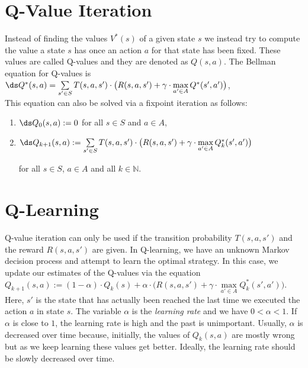 \section{Q-Value Iteration}
Instead of finding the values $V^*(s)$ of a given state $s$ we instead try to compute the value a state
$s$ has once an action $a$ for that state has been fixed.  These values are called Q-values and they
are denoted as $Q(s,a)$.  The Bellman equation for Q-values is
\\[0.2cm]
\hspace*{1.3cm}
$\ds Q^*(s,a) = \sum\limits_{s' \in S} T(s,a,s') \cdot \bigl(R(s,a,s') + \gamma \cdot \max\limits_{a' \in A} Q^*(s',a')\bigr)$,
\\[0.2cm]
This equation can also be solved via a fixpoint iteration as follows:
\begin{enumerate}
\item $\ds Q_0(s,a) := 0$ for all $s \in S$ and $a \in A$,
\item $\ds Q_{k+1}(s,a) := \sum\limits_{s' \in S} T(s,a,s') \cdot \bigl(R(s,a,s') + \gamma \cdot \max\limits_{a' \in A} Q_k^*(s',a')\bigr)$ 

      for all $s \in S$, $a \in A$ and all $k \in \mathbb{N}$.
\end{enumerate}

\section{Q-Learning}
Q-value iteration can only be used if the transition probability $T(s,a,s')$ and the reward
$R(s,a,s')$ are given.  In Q-learning, we have an unknown Markov decision process and attempt to
learn the optimal strategy.  In this case, we update our estimates of the Q-values via the equation 
\\[0.2cm]
\hspace*{1.3cm}
$Q_{k+1}(s,a) := (1-\alpha) \cdot Q_{k}(s) + \alpha \cdot \bigl(R(s,a,s') + \gamma \cdot \max\limits_{a' \in A} Q_k^*(s',a')\bigr)$. 
\\[0.2cm]
Here, $s'$ is the state that has actually been reached the last time we executed the action $a$ in
state $s$.  The variable $\alpha$ is the \emph{learning rate} and we have $0 < \alpha < 1$.  If
$\alpha$ is close to $1$, the learning rate is high and the past is unimportant.  Usually, $\alpha$ is
decreased over time because, initially, the values of $Q_k(s,a)$ are mostly wrong but as we keep
learning these values get better.  Ideally, the learning rate should be slowly decreased over time.

